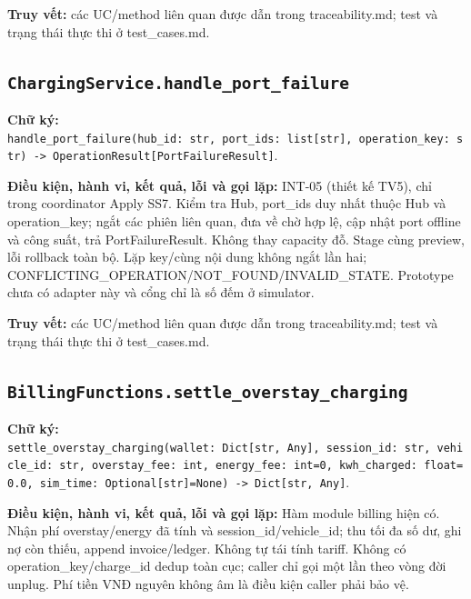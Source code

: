 \documentclass[11pt,a4paper]{article}
\begin{document}
\textbf{Truy vết:} các UC/method liên quan được dẫn trong
traceability.md; test và trạng thái thực thi ở test\_cases.md.

\hypertarget{chargingservice.handle_port_failure}{%
\subsection{\texorpdfstring{\texttt{ChargingService.handle\_port\_failure}}{ChargingService.handle\_port\_failure}}\label{chargingservice.handle_port_failure}}

\textbf{Chữ ký:}
\texttt{handle\_port\_failure(hub\_id:\ str,\ port\_ids:\ list{[}str{]},\ operation\_key:\ str)\ -\textgreater{}\ OperationResult{[}PortFailureResult{]}}.

\textbf{Điều kiện, hành vi, kết quả, lỗi và gọi lặp:} INT-05 (thiết kế
TV5), chỉ trong coordinator Apply SS7. Kiểm tra Hub, port\_ids duy nhất
thuộc Hub và operation\_key; ngắt các phiên liên quan, đưa về chờ hợp
lệ, cập nhật port offline và công suất, trả PortFailureResult. Không
thay capacity đỗ. Stage cùng preview, lỗi rollback toàn bộ. Lặp key/cùng
nội dung không ngắt lần hai;
CONFLICTING\_OPERATION/NOT\_FOUND/INVALID\_STATE. Prototype chưa có
adapter này và cổng chỉ là số đếm ở simulator.

\textbf{Truy vết:} các UC/method liên quan được dẫn trong
traceability.md; test và trạng thái thực thi ở test\_cases.md.

\hypertarget{billingfunctions.settle_overstay_charging}{%
\subsection{\texorpdfstring{\texttt{BillingFunctions.settle\_overstay\_charging}}{BillingFunctions.settle\_overstay\_charging}}\label{billingfunctions.settle_overstay_charging}}

\textbf{Chữ ký:}
\texttt{settle\_overstay\_charging(wallet:\ Dict{[}str,\ Any{]},\ session\_id:\ str,\ vehicle\_id:\ str,\ overstay\_fee:\ int,\ energy\_fee:\ int=0,\ kwh\_charged:\ float=0.0,\ sim\_time:\ Optional{[}str{]}=None)\ -\textgreater{}\ Dict{[}str,\ Any{]}}.

\textbf{Điều kiện, hành vi, kết quả, lỗi và gọi lặp:} Hàm module billing
hiện có. Nhận phí overstay/energy đã tính và session\_id/vehicle\_id;
thu tối đa số dư, ghi nợ còn thiếu, append invoice/ledger. Không tự tái
tính tariff. Không có operation\_key/charge\_id dedup toàn cục; caller
chỉ gọi một lần theo vòng đời unplug. Phí tiền VNĐ nguyên không âm là
điều kiện caller phải bảo vệ.
\end{document}

